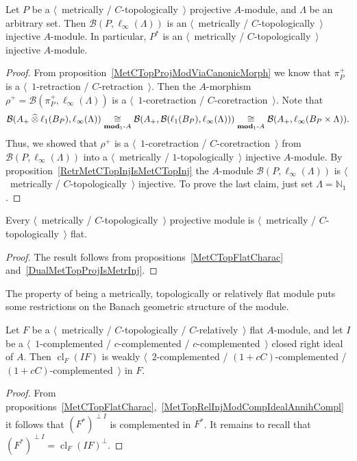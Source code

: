 \begin{proposition}\label{DualMetTopProjIsMetrInj} Let $P$ be a
$\langle$~metrically / $C$-topologically~$\rangle$ projective $A$-module, and
$\Lambda$ be an arbitrary set. Then $\mathcal{B}(P,\ell_\infty(\Lambda))$ is an
$\langle$~metrically / $C$-topologically~$\rangle$ injective $A$-module. In
particular, $P^*$ is an $\langle$~metrically / $C$-topologically~$\rangle$
injective $A$-module.
\end{proposition}
\begin{proof} From proposition~\ref{MetCTopProjModViaCanonicMorph} we know 
that $\pi_P^+$ is a $\langle$~$1$-retraction / $C$-retraction~$\rangle$. 
Then the $A$-morphism
$\rho^+=\mathcal{B}(\pi_P^+,\ell_\infty(\Lambda))$ is a
$\langle$~$1$-coretraction / $C$-coretraction~$\rangle$. Note that
\[
\mathcal{B}(A_+\mathbin{\widehat{\otimes}}\ell_1(B_P),\ell_\infty(\Lambda))
\mathrel{\mathop{\cong}\limits_{\mathbf{mod}_1\text{-}A}}
\mathcal{B}(A_+,\mathcal{B}(\ell_1(B_P),\ell_\infty(\Lambda)))
\mathrel{\mathop{\cong}\limits_{\mathbf{mod}_1\text{-}A}}
\mathcal{B}(A_+,\ell_\infty(B_P\times\Lambda)).
\] 
Thus, we showed that $\rho^+$ is a $\langle$~$1$-coretraction /
$C$-coretraction~$\rangle$ from $\mathcal{B}(P,\ell_\infty(\Lambda))$ into a
$\langle$~metrically / $1$-topologically~$\rangle$ injective $A$-module. By
proposition~\ref{RetrMetCTopInjIsMetCTopInj} the $A$-module
$\mathcal{B}(P,\ell_\infty(\Lambda))$ is $\langle$~metrically /
$C$-topologically~$\rangle$ injective. To prove the last claim, just set
$\Lambda=\mathbb{N}_1$.
\end{proof}

\begin{proposition}\label{MetTopProjIsMetTopFlat} Every $\langle$~metrically /
$C$-topologically~$\rangle$ projective module is $\langle$~metrically /
$C$-topologically~$\rangle$ flat.
\end{proposition}
\begin{proof} The result follows from propositions~\ref{MetCTopFlatCharac}
and~\ref{DualMetTopProjIsMetrInj}.
\end{proof}

The property of being a metrically, topologically or relatively flat module 
puts some restrictions on the Banach geometric structure of the module.

\begin{proposition}\label{MetTopRelFlatModCompIdealPartCompl} Let $F$ 
be a $\langle$~metrically / $C$-topologically / $C$-relatively~$\rangle$ 
flat $A$-module, and let $I$ 
be a $\langle$~$1$-complemented / $c$-complemented / $c$-complemented~$\rangle$
closed right ideal of $A$. Then $\operatorname{cl}_F(I F)$ 
is weakly $\langle$~$2$-complemented / $(1+cC)$-complemented / 
$(1+cC)$-complemented~$\rangle$  in $F$.
\end{proposition}
\begin{proof} From 
propositions~\ref{MetCTopFlatCharac},~\ref{MetTopRelInjModCompIdealAnnihCompl} 
it follows that ${(F^*)}^{\perp I}$ is complemented in $F^*$. It remains to 
recall that ${(F^*)}^{\perp I}={\operatorname{cl}_F(I F)}^\perp$. 
\end{proof}

